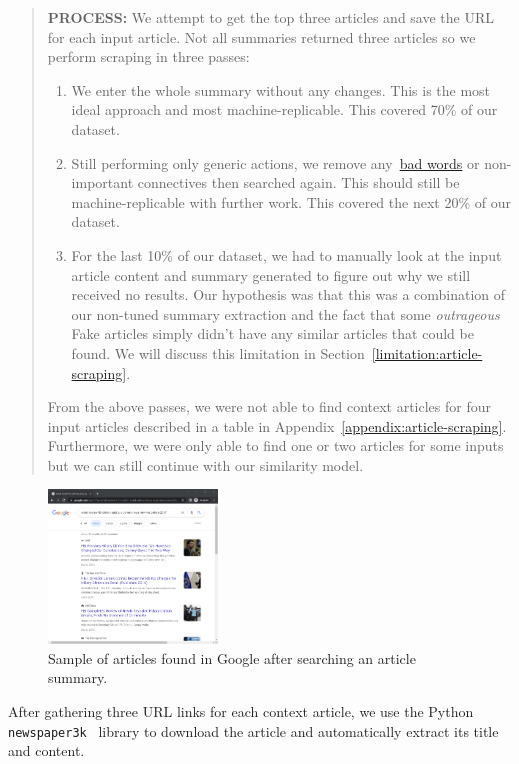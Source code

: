 \documentclass{article}
\begin{document}
\begin{quote}
  \textbf{PROCESS:} We attempt to get the top three articles and save the URL for each input article. Not all summaries returned three articles so we perform scraping in three passes:
  \begin{enumerate}
    \item We enter the whole summary without any changes. This is the most ideal approach and most machine-replicable. This covered 70\% of our dataset.
    \item Still performing only generic actions, we remove any~\hyperref[summary-extraction:bad-words]{\color{blue}bad words} or non-important connectives then searched again. This should still be machine-replicable with further work. This covered the next 20\% of our dataset.
    \item For the last 10\% of our dataset, we had to manually look at the input article content and summary generated to figure out why we still received no results. Our hypothesis was that this was a combination of our non-tuned summary extraction and the fact that some \emph{outrageous} Fake articles simply didn't have any similar articles that could be found. We will discuss this limitation in Section~\ref{limitation:article-scraping}.
  \end{enumerate}
  From the above passes, we were not able to find context articles for four input articles described in a table in Appendix~\ref{appendix:article-scraping}. Furthermore, we were only able to find one or two articles for some inputs but we can still continue with our similarity model.
\end{quote}

\begin{figure}[H]
  \centering
  \includegraphics[width=0.4\textwidth]{img/chrome-article-scraping.png}
  \caption{Sample of articles found in Google after searching an article summary.}
\end{figure}

\noindent
After gathering three URL links for each context article, we use the Python \verb|newspaper3k|~\cite{py-newspaper} library to download the article and automatically extract its title and content.
\end{document}
